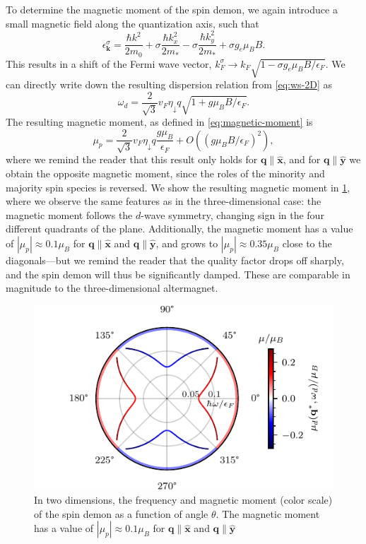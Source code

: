 \documentclass[aps,prb,reprint,twocolumns,superscriptaddress,nofootinbib]{revtex4-2}
\newcommand{\xx}{\hat{\bm{x}}}
\newcommand{\yy}{\hat{\bm{y}}}
\newcommand{\kF}{k_{F}}
\begin{document}
	To determine the magnetic moment of the spin demon, we again introduce a small magnetic field along the quantization axis, such that
	\begin{equation}
		\epsilon_{\bm k}^\sigma = \frac{\hbar k^2}{2m_0} + \sigma \frac{\hbar k_x^2}{2m_*} - \sigma \frac{\hbar k_y^2}{2m_*} + \sigma g_e\mu_B B.
	\end{equation} 
	This results in a shift of the Fermi wave vector, $\kF^\sigma\rightarrow \kF\sqrt{1-\sigma g_e\mu_B B / \epsilon_F}$. We can  directly write down the resulting dispersion relation from \cref{eq:ws-2D} as
	\begin{equation}
		\omega_{d}=\frac{2}{\sqrt{3}} v_F \eta_\downarrow q \sqrt{1+g\mu_B B / \epsilon_F}.
	\end{equation}
	The resulting magnetic moment, as defined in \cref{eq:magnetic-moment} is 
	\begin{equation}
		\mu_p = \frac{2}{\sqrt{3}} v_F \eta_\downarrow q \frac{g\mu_B}{\epsilon_F} + O((g\mu_B B / \epsilon_F)^2),
	\end{equation}
	where we remind the reader that this result only holds for $\bm q\parallel \xx$, and for $\bm q\parallel \yy$ we obtain the opposite magnetic moment, since the roles of the minority and majority spin species is reversed. We show the resulting magnetic moment in \cref{fig:2D-magnetic-moment}, where we observe the same features as in the three-dimensional case: the magnetic moment follows the $d$-wave symmetry, changing sign in the four different quadrants of the plane. Additionally, the magnetic moment has a value of $|\mu_p|\approx 0.1\mu_B$ for $\bm q\parallel\xx$ and $\bm q\parallel\yy$, and grows to $|\mu_p|\approx 0.35\mu_B$ close to the diagonals---but we remind the reader that the quality factor drops off sharply, and the spin demon will thus be significantly damped. These are comparable in magnitude to the three-dimensional altermagnet.
	
	\begin{figure}
		\includegraphics{2D-polar-plot-sign}
		\caption{In two dimensions, the frequency and magnetic moment (color scale) of the spin demon as a function of angle $\theta$. The magnetic moment has a value of $|\mu_p|\approx 0.1\mu_B$ for $\bm q\parallel\xx$ and $\bm q\parallel\yy$ \label{fig:2D-magnetic-moment}}
	\end{figure}
	
\end{document}
